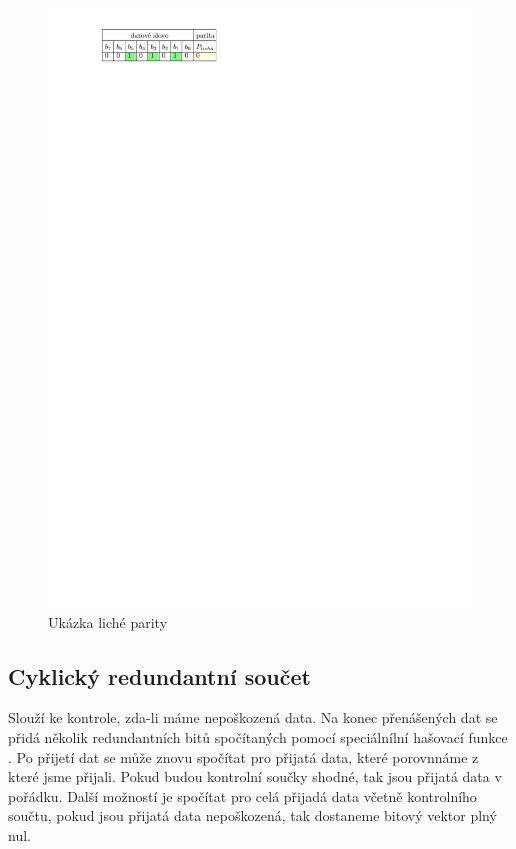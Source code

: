 \begin{figure}[H]
    \begin{center}
        \includegraphics[scale=1]{img/parita_licha}
    \end{center}
    \caption{Ukázka liché parity}
\end{figure}

\subsection{Cyklický redundantní součet}
Slouží ke kontrole, zda-li máme nepoškozená data. Na konec přenášených dat se přidá několik redundantních bitů spočítaných pomocí speciálnílní hašovací funkce . Po přijetí dat se může znovu spočítat  pro přijatá data, které porovnnáme z  které jsme přijali. Pokud budou kontrolní součky shodné, tak jsou přijatá data v pořádku. Další možností je spočítat  pro celá přijadá data včetně kontrolního součtu, pokud jsou přijatá data nepoškozená,  tak dostaneme bitový vektor plný nul.

